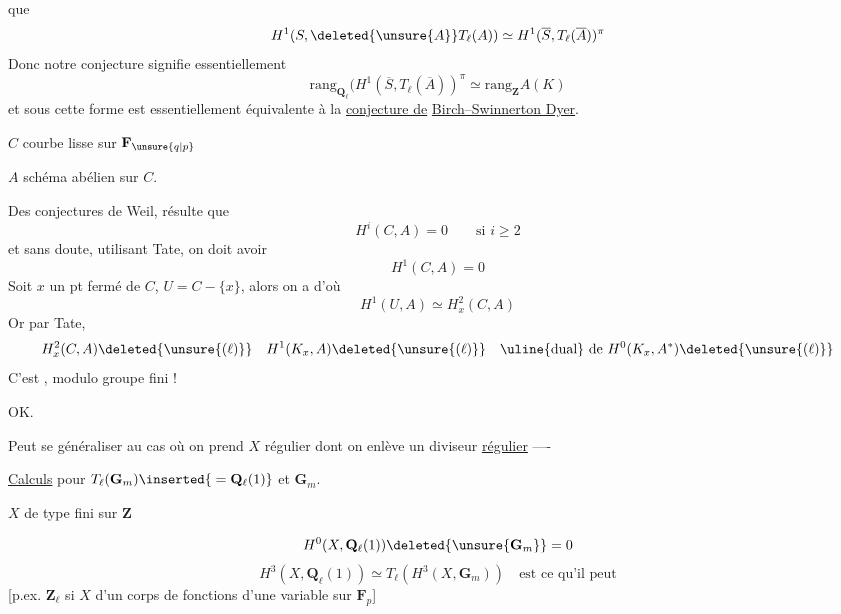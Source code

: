  que
\[
H^1(S,\deleted{\unsure{A}}T_\ell(A))\simeq H^1(\overline{S},T_\ell(\overline{A}))^\pi
\]
Donc notre conjecture signifie essentiellement
\[
\mathrm{rang}_{\mathbf{Q}_\ell}(H^1(\overline{S},T_\ell(\overline{A}))^\pi\simeq\mathrm{rang}_{\mathbf{Z}}A(K)
\]
et sous cette forme est essentiellement équivalente à la \uline{conjecture de}  \uline{Birch--Swinnerton Dyer}.

$C$ courbe lisse  sur $\mathbf{F}_{\unsure{q|p}}$

$A$ schéma abélien sur $C$.

Des conjectures de Weil, résulte que
\[
H^i(C,A)=0\qquad\text{si }i\ge2
\]
et sans doute, utilisant Tate, on doit avoir
\[
H^1(C,A)=0
\]
Soit $x$ un pt fermé de $C$, $U=C-\{x\}$, alors on a
d'où
\[
H^1(U,A)\simeq H^2_x(C,A)
\]
Or par Tate,
\[
H^2_x(C,A)\deleted{\unsure{(\ell)}}\quad H^1(K_x,A)\deleted{\unsure{(\ell)}}\quad\uline{\text{dual}}\text{ de }H^0(K_x,A^*)\deleted{\unsure{(\ell)}}
\]
C'est , modulo groupe fini !

OK.

Peut se généraliser au cas où on prend $X$ régulier dont on enlève un diviseur \uline{régulier} ----

\uline{Calculs} pour $T_\ell(\mathbf G_m)\inserted{{}=\mathbf Q_\ell(1)}$ et $\mathbf G_m$.

$X$ de type fini sur $\mathbf Z$

\[
H^0(X,\mathbf Q_\ell(1))\deleted{\unsure{\mathbf G_m}}=0
\]
\[
H^3(X,\mathbf Q_\ell(1))\simeq T_\ell(H^3(X,\mathbf G_m))\quad\text{est ce qu'il peut}
\]
\hfill [p.ex. $\mathbf Z_\ell$ si $X$   d'un
corps de fonctions d'une variable sur $\mathbf F_p$]

